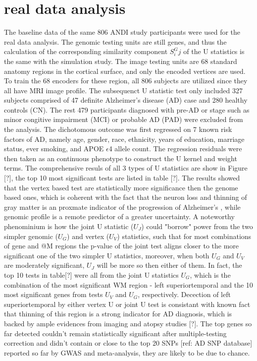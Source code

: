 \documentclass[twocolumn]{article}
\begin{document}
\section{real data analysis}
The baseline data of the same 806 ANDI study participants were used for the real data analysis. The genomic testing units are still genes, and thus the calculation of the corresponding similarity component $S^G_ij$ of the U statistics is the same with the simulation study. The image testing units are 68 standard anatomy regions in the cortical surface, and only the encoded vertices are used. To train the 68 encoders for these region, all 806 subjects are utilized since they all have MRI image profile. The subsequenct U statistic test only included 327 subjects comprised of 47 definite Alzheimer's disease (AD) case and 280 healthy controls (CN). The rest 479 participants diagnosed with pre-AD or stage such as minor congitive impairment (MCI) or probable AD (PAD) were excluded from the analysis. The dichotomous outcome was first regressed on 7 known risk factors of AD, namely age, gender, race, ethnicity, years of education, marriage status, ever smoking, and APOE $\epsilon$4 allele count. The regression residuals were then taken as an continuous phenotype to construct the U kernel and weight terms. The comprehensive resuls of all 3 types of U statistics are show in Figure [?], the top 10 most significant tests are listed in table [?]. 
The results showed that the vertex based test are statistically more significance then the genome based ones, which is coherent with the fact that the neuron loss and thinning of gray matter is an proxmate indicator of the progression of Alzheimer's , while genomic profile is a remote predictor of a greater uncertainty. A noteworthy phenominium is how the joint U statistic ($U_J$) could "borrow" power from the two simpler genomic ($U_G$) and vertex ($U_V$) statistics, such that for most combinations of gene and @M regions the p-value of the joint test aligns closer to the more significant one of the two simpler U statistics, moreover, when both $U_G$ and $U_V$ are moderately significant, $U_J$ will be more so then either of them. In fact, the top 10 tests in table[?] were all from the joint U statistics $U_G$, which is the combination of the most significant WM region - left superiortemporal and the 10 most significant genes from tests $U_V$ and $U_G$, respectively. Decection of left superiortemporal by either vertex U or joint U test is consistant with known fact that thinning of this region is a strong indicator for AD diagnosis, which is backed by ample evidences from imaging and atopsy studies [?]. The top genes so far detected couldn't remain statistically significant after multiple-testing correction and didn't contain or close to the top 20 SNPs [ref: AD SNP database] reported so far by GWAS and meta-analysis, they are likely to be due to chance. 
\end{document}
